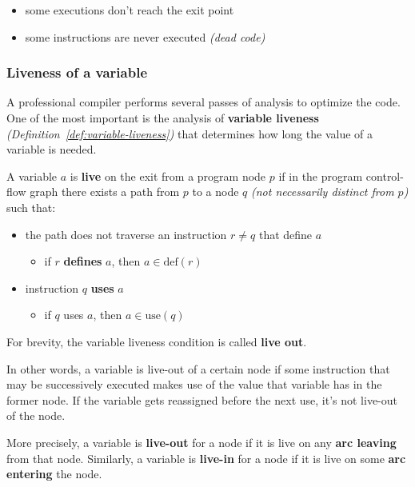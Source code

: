 \documentclass[english]{article}
\begin{document}
\begin{itemize}
  \item some executions don't reach the exit point
  \item some instructions are never executed \textit{(dead code)}
\end{itemize}

\subsubsection{Liveness of a variable}

A professional compiler performs several passes of analysis to optimize the code.
One of the most important is the analysis of \textbf{variable liveness} \textit{(Definition~\ref{def:variable-liveness})} that determines how long the value of a variable is needed.

\begin{definition}
  \label{def:variable-liveness}
  A variable \(a\) is \textbf{live} on the exit from a program node \(p\) if in the program control-flow graph there exists a path from \(p\) to a node \(q\) \textit{(not necessarily distinct from \(p\))} such that:
  \begin{itemize}
    \item the path does not traverse an instruction \(r \neq q\) that define \(a\)
          \begin{itemize}[label=\(\rightarrow\)]
            \item if \(r\) \textbf{defines} \(a\), then \(a \in \text{def}\left(r\right)\)
          \end{itemize}
    \item instruction \(q\) \textbf{uses} \(a\)
          \begin{itemize}[label=\(\rightarrow\)]
            \item if \(q\) uses \(a\), then \(a \in \text{use}\left(q\right)\)
          \end{itemize}
  \end{itemize}
  For brevity, the variable liveness condition is called \textbf{live out}.
\end{definition}

In other words, a variable is live-out of a certain node if some instruction that may be successively executed makes use of the value that variable has in the former node.
If the variable gets reassigned before the next use, it's not live-out of the node.

More precisely, a variable is \textbf{live-out} for a node if it is live on any \textbf{arc leaving} from that node.
Similarly, a variable is \textbf{live-in} for a node if it is live on some \textbf{arc entering} the node.
\end{document}

